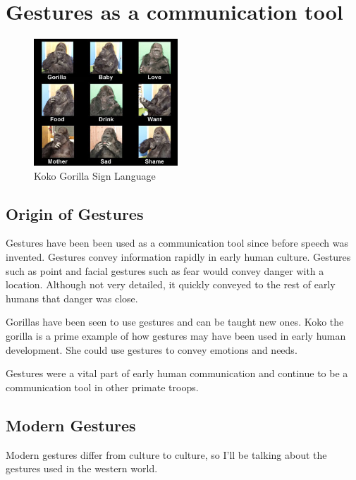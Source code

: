 \chapter{Gestures as a communication tool}

\begin{figure}
  \begin{center}
    \includegraphics[width=0.48\textwidth]{img/gorillagesture.jpg}
  \end{center}
  \caption{Koko Gorilla Sign Language}
\end{figure}

\section{Origin of Gestures}
Gestures have been been used as a communication tool since before speech was invented. Gestures convey information rapidly in early human culture. \cite{nonverbalgesture} Gestures such as point and facial gestures such as fear would convey danger with a location. Although not very detailed, it quickly conveyed to the rest of early humans that danger was close. \cite{nonverbalgesture}

Gorillas have been seen to use gestures and can be taught new ones. Koko the gorilla is a prime example of how gestures may have been used in early human development. She could use gestures to convey emotions and needs. \cite{koko}

Gestures were a vital part of early human communication and continue to be a communication tool in other primate troops.

\section{Modern Gestures}

Modern gestures differ from culture to culture, so I'll be talking about the gestures used in the western world.

